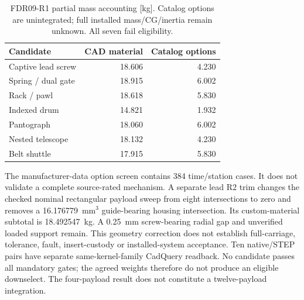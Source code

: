 \documentclass[conference]{IEEEtran}
\begin{document}
\begin{table}[t]
\centering
\caption{FDR09-R1 partial mass accounting [kg]. Catalog options are unintegrated; full installed mass/CG/inertia remain unknown. All seven fail eligibility.}
\label{tab:fdr09}
\begin{tabular}{lrr}
\toprule
Candidate & CAD material & Catalog options\\
\midrule
Captive lead screw & 18.606 & 4.230\\
Spring / dual gate & 18.915 & 6.002\\
Rack / pawl & 18.618 & 5.830\\
Indexed drum & 14.821 & 1.932\\
Pantograph & 18.060 & 6.002\\
Nested telescope & 18.132 & 4.230\\
Belt shuttle & 17.915 & 5.830\\
\bottomrule
\end{tabular}
\end{table}
The manufacturer-data option screen contains 384 time/station cases. It does not validate a complete source-rated mechanism. A separate lead R2 trim changes the checked nominal rectangular payload sweep from eight intersections to zero and removes a 16.176779~mm$^3$ guide-bearing housing intersection. Its custom-material subtotal is 18.492547~kg. A 0.25~mm screw-bearing radial gap and unverified loaded support remain. This geometry correction does not establish full-carriage, tolerance, fault, insert-custody or installed-system acceptance. Ten native/STEP pairs have separate same-kernel-family CadQuery readback. No candidate passes all mandatory gates; the agreed weights therefore do not produce an eligible downselect. The four-payload result does not constitute a twelve-payload integration.
\end{document}
